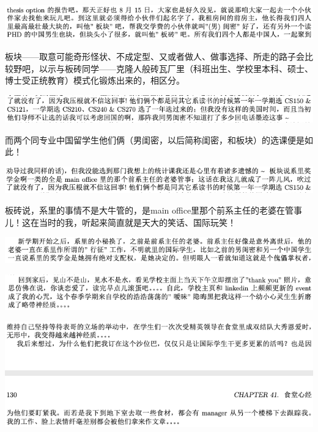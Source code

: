 \documentclass[9pt, b5paper]{article}
\begin{document}
\begin{center}
\includegraphics[width=.9\linewidth]{./pic/backups_plans_20210424_114632.png}
\end{center}

板块——取意可能奇形怪状、不成定型、又或者做人、做事选择、所走的路子会比较野吧，以示与板砖同学——克隆人般砖瓦厂里（科班出生、学校里本科、硕士、博士受正统教育）模式化锻炼出来的，相区分。

\begin{center}
\includegraphics[width=.9\linewidth]{./pic/backups_plans_20210424_114938.png}
\end{center}

而两个同专业中国留学生他们俩（男闺密，以后简称闺密，和板块）的选课便是如此！

\begin{center}
\includegraphics[width=.9\linewidth]{./pic/backups_plans_20210424_114917.png}
\end{center}

板砖说，系里的事情不是大牛管的，是main office里那个前系主任的老婆在管事儿！这在当时的我，听起来简直就是天大的笑话、国际玩笑！

\begin{center}
\includegraphics[width=.9\linewidth]{./pic/backups_plans_20210424_155833.png}
\end{center}


\begin{center}
\includegraphics[width=.9\linewidth]{./pic/backups_plans_20210424_121459.png}
\end{center}

\begin{center}
\includegraphics[width=.9\linewidth]{./pic/backups_plans_20210424_121700.png}
\end{center}
\end{document}
